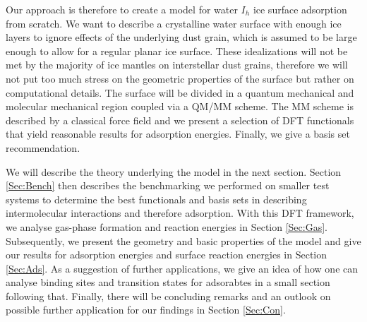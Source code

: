\documentclass[8.5pt,twoside,twocolumn]{article}
\theoremstyle{standard}
\begin{document}
Our approach is therefore to create a model for water $I_h$ ice surface
adsorption from scratch. We want to describe a crystalline water surface with
enough ice layers to ignore effects of the underlying dust
grain, which is assumed to be large enough to allow for a regular planar ice
surface. These idealizations will not be met by the majority of ice mantles on
interstellar dust grains, therefore we will not put too much stress on the
geometric properties of the surface but rather on computational details. The
surface will be divided in a quantum mechanical and molecular mechanical region
coupled via a QM/MM scheme. The MM scheme is described by a classical force
field and we present a selection of DFT functionals that yield reasonable
results for adsorption energies. Finally, we give a basis set recommendation.
% 

We will describe the theory underlying the model in the next section. Section
\ref{Sec:Bench} then describes the benchmarking we performed on smaller test
systems to determine the best functionals and basis sets in describing
intermolecular interactions and therefore adsorption. With this DFT
framework, we analyse gas-phase formation and reaction energies in Section
\ref{Sec:Gas}. Subsequently, we present the geometry and basic properties of the
model and give our results for adsorption energies and surface reaction
energies in Section \ref{Sec:Ads}. As a suggestion of further applications, we
give an idea of how one can analyse binding sites and transition states for
adsorabtes in a small section following that. Finally, there will be concluding
remarks and an outlook on possible further application for our findings in
Section \ref{Sec:Con}.
\end{document}
